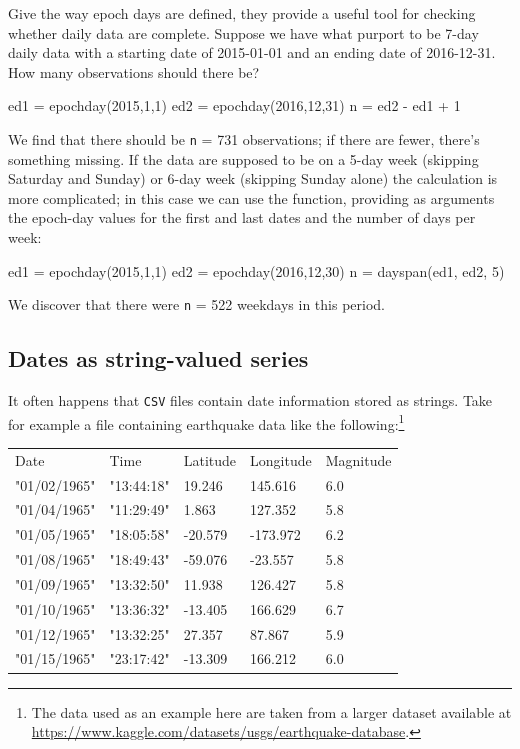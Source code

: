 Give the way epoch days are defined, they provide a useful tool for
checking whether daily data are complete. Suppose we have what purport
to be 7-day daily data with a starting date of 2015-01-01 and an
ending date of 2016-12-31. How many observations should there be?
%
\begin{code}
ed1 = epochday(2015,1,1)
ed2 = epochday(2016,12,31)
n = ed2 - ed1 + 1
\end{code}
We find that there should be \texttt{n} = 731 observations; if there
are fewer, there's something missing. If the data are supposed to be
on a 5-day week (skipping Saturday and Sunday) or 6-day week (skipping
Sunday alone) the calculation is more complicated; in this case we can
use the  function, providing as arguments the
epoch-day values for the first and last dates and the number of days
per week:
\begin{code}
ed1 = epochday(2015,1,1)
ed2 = epochday(2016,12,30)
n = dayspan(ed1, ed2, 5)
\end{code}
%
We discover that there were \texttt{n} = 522 weekdays in this period.

\subsection{Dates as string-valued series}

It often happens that \texttt{CSV} files contain date information
stored as strings. Take for example a file containing earthquake data
like the following:\footnote{The data used as an example here are
  taken from a larger dataset available at
  \url{https://www.kaggle.com/datasets/usgs/earthquake-database}.}

\begin{center}
  \begin{small}
      \begin{tabular}{lllll}
        Date	& Time	& Latitude	& Longitude                & Magnitude \\
        "01/02/1965"	& "13:44:18"	& 19.246	& 145.616  & 6.0       \\
        "01/04/1965"	& "11:29:49"	& 1.863	        & 127.352  & 5.8       \\
        "01/05/1965"	& "18:05:58"	& -20.579	& -173.972 & 6.2       \\
        "01/08/1965"	& "18:49:43"	& -59.076	& -23.557  & 5.8       \\
        "01/09/1965"	& "13:32:50"	& 11.938	& 126.427  & 5.8       \\
        "01/10/1965"	& "13:36:32"	& -13.405	& 166.629  & 6.7       \\
        "01/12/1965"	& "13:32:25"	& 27.357	& 87.867   & 5.9       \\
        "01/15/1965"	& "23:17:42"	& -13.309	& 166.212  & 6.0       
      \end{tabular}
  \end{small}
\end{center}

